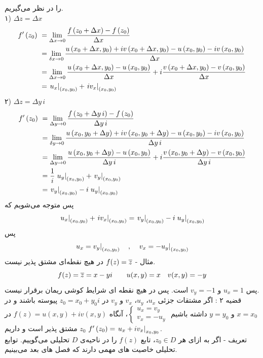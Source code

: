 را در نظر می‌گیریم.\\
۱)
$\Delta z=\Delta x$
\[\begin{aligned}
	f^\prime\left(z_0\right) &\ =
	\lim_{\Delta x\to0}\frac{f\left(z_0+\Delta x\right)-f\left(z_0\right)}{\Delta x}
	\\ &\
	=\lim_{\delta x\to0}\frac{u\left(x_0+\Delta x,y_0\right)+iv\left(x_0+\Delta x,y_0\right)-u\left(x_0,y_0\right)-iv\left(x_0,y_0\right)}{\Delta x}
	\\ &\
	=\lim_{\Delta x\to0}\frac{u\left(x_0+\Delta x,y_0\right)-u\left(x_0,y_0\right)}{\Delta x}+i \frac{v\left(x_0+\Delta x,y_0\right)-v\left(x_0,y_0\right)}{\Delta x}
	\\ &\
	=\left.{u_x}\right|_{\left(x_0,y_0\right)}+\left.{iv_x}\right|_{\left(x_0,y_0\right)}
\end{aligned}\]
۲)
$\Delta z=\Delta y\, i$
\[\begin{aligned}
	f^\prime\left(z_0\right) &\ =
	\lim_{\Delta y\to0}\frac{f\left(z_0+\Delta y\,i\right)-f\left(z_0\right)}{\Delta y\,i}
	\\ &\
	=\lim_{\delta y\to0}\frac{u\left(x_0,y_0+\Delta y\right)+iv\left(x_0,y_0+\Delta y\right)-u\left(x_0,y_0\right)-iv\left(x_0,y_0\right)}{\Delta y\,i}
	\\ &\
	=\lim_{\Delta y\to0}\frac{u\left(x_0,y_0+\Delta y\right)-u\left(x_0,y_0\right)}{\Delta y\,i}+i \frac{v\left(x_0,y_0+\Delta y\right)-v\left(x_0,y_0\right)}{\Delta y\,i}
	\\ &\
	=\frac1i\left.{u_y}\right|_{\left(x_0,y_0\right)}+\left.{v_y}\right|_{\left(x_0,y_0\right)}
	\\ &\
	=\left.{v_y}\right|_{\left(x_0,y_0\right)}-i\left.{u_y}\right|_{\left(x_0,y_0\right)}
\end{aligned}\]
پس متوجه می‌شویم که
\[
\left.{u_x}\right|_{\left(x_0,y_0\right)}+\left.{iv_x}\right|_{\left(x_0,y_0\right)}
=
\left.{v_y}\right|_{\left(x_0,y_0\right)}-i\left.{u_y}\right|_{\left(x_0,y_0\right)}
\]
پس
\[
\left.{u_x=v_y}\right|_{\left(x_0,y_0\right)} \quad , \quad
\left.{v_x=-u_y}\right|_{\left(x_0,y_0\right)}
\]
مثال -
$f(z)=\overline{z}$
در هیچ نقطه‌ای مشتق پذیر نیست.
\[
f(z)=\overline{z}=x-yi \qquad u(x,y)=x \quad v(x,y)=-y
\]
پس
$u_x=1$
و
$v_y=-1$
است. پس در هیچ نقطه ای شرایط کوشی ریمان برقرار نیست.\\
قضیه ۲ : اگر مشتقات جزئی
$u_x$،
$u_y$،
$v_x$
و
$v_y$
در
$z_0=x_0+y_0i$
پیوسته باشند و در
$x=x_0$
و
$y=y_0$
داشته باشیم
$\begin{cases}
	u_x=v_y\\ v_x=-u_y
\end{cases}$،
آنگاه
$f(z)=u(x,y)+iv(x,y)$
در
$z_0$
مشتق پذیر است و داریم
$f^\prime\left(z_0\right)=\left.{u_x+iv_x}\right|_{x_0,y_0}$.\\
تعریف - اگر به ازای هر
$z_0\in D$،
تابع
$f(z)$
را در ناحیه‌ی
$D$
تحلیلی می‌گوییم. توابع تحلیلی خاصیت های مهمی دارند که فصل های بعد می‌بینیم.\\
